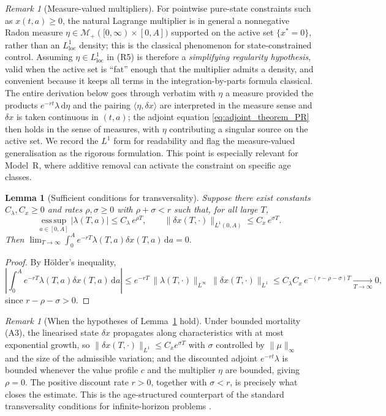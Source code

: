 \documentclass[pdflatex,sn-mathphys-num]{sn-jnl}
\newtheorem{lemma}[theorem]{Lemma}
\theoremstyle{definition}
\theoremstyle{remark}
\newtheorem{remark}[theorem]{Remark}
\newcommand{\dd}{\,\mathrm{d}}
\begin{document}
\begin{remark}[Measure-valued multipliers]
\label{rem:measure_multiplier}
For pointwise pure-state constraints such as $x(t,a)\ge0$, the natural
Lagrange multiplier is in general a nonnegative Radon measure
$\eta\in\mathcal{M}_+([0,\infty)\times[0,A])$ supported on the active set
$\{x^\ast=0\}$, rather than an $L^1_{\mathrm{loc}}$ density; this is the
classical phenomenon for state-constrained control. Assuming
$\eta\in L^1_{\mathrm{loc}}$ in (R5) is therefore a \emph{simplifying
regularity hypothesis}, valid when the active set is ``fat'' enough that the
multiplier admits a density, and convenient because it keeps all terms in
the integration-by-parts formula classical. The entire derivation below goes
through verbatim with $\eta$ a measure provided the products
$e^{-rt}\lambda\dd\eta$ and the pairing $\langle\eta,\delta x\rangle$ are
interpreted in the measure sense and $\delta x$ is taken continuous in
$(t,a)$; the adjoint equation \eqref{eq:adjoint_theorem_PR} then holds in the
sense of measures, with $\eta$ contributing a singular source on the active
set. We record the $L^1$ form for readability and flag the measure-valued
generalisation as the rigorous formulation. This point is especially
relevant for Model~R, where additive removal can activate the constraint on
specific age classes.
\end{remark}

\begin{lemma}[Sufficient conditions for transversality]
\label{lem:transversality_suff}
Suppose there exist constants $C_\lambda,C_x\ge0$ and rates
$\rho,\sigma\ge0$ with $\rho+\sigma<r$ such that, for all large $T$,
\[
\operatorname*{ess\,sup}_{a\in[0,A]}|\lambda(T,a)|\le C_\lambda\,e^{\rho T},
\qquad
\|\delta x(T,\cdot)\|_{L^1(0,A)}\le C_x\,e^{\sigma T}.
\]
Then
$\displaystyle\lim_{T\to\infty}\int_0^A e^{-rT}\lambda(T,a)\delta x(T,a)\dd a=0.$
\end{lemma}
\begin{proof}
By H\"older's inequality,
\[
\left|\int_0^A e^{-rT}\lambda(T,a)\delta x(T,a)\dd a\right|
\le e^{-rT}\,\|\lambda(T,\cdot)\|_{L^\infty}\,\|\delta x(T,\cdot)\|_{L^1}
\le C_\lambda C_x\,e^{-(r-\rho-\sigma)T}\xrightarrow[T\to\infty]{}0,
\]
since $r-\rho-\sigma>0$.
\end{proof}

\begin{remark}[When the hypotheses of Lemma~\ref{lem:transversality_suff} hold]
Under bounded mortality (A3), the linearised state $\delta x$ propagates
along characteristics with at most exponential growth, so
$\|\delta x(T,\cdot)\|_{L^1}\le C_x e^{\sigma T}$ with $\sigma$ controlled by
$\|\mu\|_\infty$ and the size of the admissible variation; and the
discounted adjoint $e^{-rt}\lambda$ is bounded whenever the value profile $c$
and the multiplier $\eta$ are bounded, giving $\rho=0$. The positive discount
rate $r>0$, together with $\sigma<r$, is precisely what closes the estimate.
This is the age-structured counterpart of the standard transversality
conditions for infinite-horizon problems
\citep{aseev_infinite-horizon_2012,aseev_maximum_2015,cai2026optimal}.
\end{remark}
\end{document}
